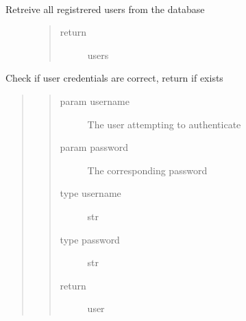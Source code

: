 \documentclass[letterpaper,10pt,english]{sphinxmanual}
\begin{document}
\begin{fulllineitems}
\label{\detokenize{index:models.login.get_users}}~\begin{description}
\item[{Retreive all registrered users from the database}] \leavevmode\begin{quote}\begin{description}
\item[{return}] \leavevmode
users

\end{description}\end{quote}

\end{description}

\end{fulllineitems}


\begin{fulllineitems}
\label{\detokenize{index:models.login.match_user}}
Check if user credentials are correct, return if exists
\begin{quote}
\begin{quote}\begin{description}
\item[{param username}] \leavevmode
The user attempting to authenticate

\item[{param password}] \leavevmode
The corresponding password

\item[{type username}] \leavevmode
str

\item[{type password}] \leavevmode
str

\item[{return}] \leavevmode
user

\end{description}\end{quote}
\end{quote}

\end{fulllineitems}

\label{\detokenize{index:module-models.project}}
\end{document}

